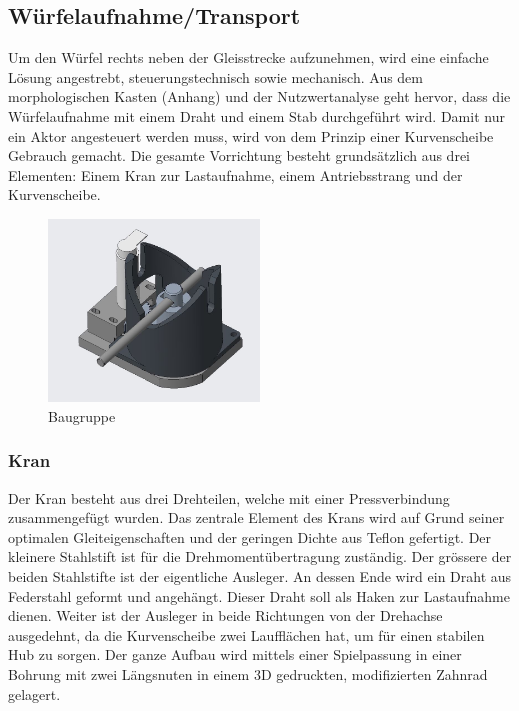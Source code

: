 \documentclass[../../main.tex]{subfiles}
\begin{document}
    \subsection{Würfelaufnahme/Transport}
         Um den Würfel rechts neben der Gleisstrecke aufzunehmen, wird eine einfache Lösung angestrebt, steuerungstechnisch sowie mechanisch. Aus dem morphologischen Kasten (Anhang) und der Nutzwertanalyse geht hervor, dass die Würfelaufnahme mit einem Draht und einem Stab durchgeführt wird. Damit nur ein Aktor angesteuert werden muss, wird von dem Prinzip einer Kurvenscheibe Gebrauch gemacht. Die gesamte Vorrichtung besteht grundsätzlich aus drei Elementen: Einem Kran zur Lastaufnahme, einem Antriebsstrang und der Kurvenscheibe.

        \begin{figure}[H]
            \centering
            \includegraphics[width=0.5\textwidth]{../../images/Kran/BG.JPG}
            \caption {Baugruppe}
        \end{figure}

    \subsubsection{Kran}
         Der Kran besteht aus drei Drehteilen, welche mit einer Pressverbindung zusammengefügt wurden. Das zentrale Element des Krans wird auf Grund seiner optimalen Gleiteigenschaften und der geringen Dichte aus Teflon gefertigt. Der kleinere Stahlstift ist für die Drehmomentübertragung zuständig. Der grössere der beiden Stahlstifte ist der eigentliche Ausleger. An dessen Ende wird ein Draht aus Federstahl geformt und angehängt. Dieser Draht soll als Haken zur Lastaufnahme dienen. Weiter ist der Ausleger in beide Richtungen von der Drehachse ausgedehnt, da die Kurvenscheibe zwei Laufflächen hat, um für einen stabilen Hub zu sorgen. Der ganze Aufbau wird mittels einer Spielpassung in einer Bohrung mit zwei Längsnuten in einem 3D gedruckten, modifizierten Zahnrad gelagert.
\end{document}
